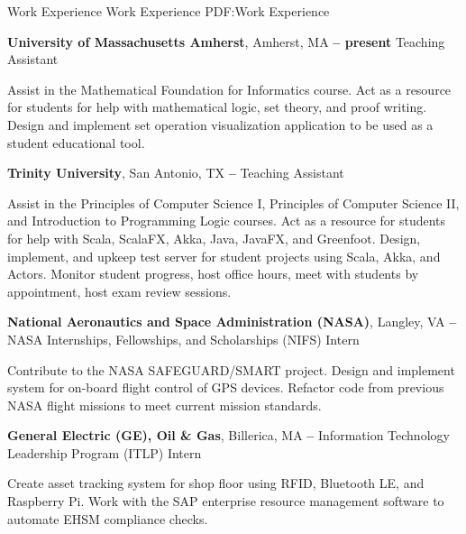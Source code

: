 \Section
{Work Experience}
{Work Experience}
{PDF:Work Experience}

\Entry
\textbf{University of Massachusetts Amherst},
Amherst, MA 
\dotfill
\textbf{ -- present}
\Gap
Teaching Assistant
\begin{Detail}
    \SubBulletItem
    Assist in the Mathematical Foundation for Informatics course.
    \SubBulletItem
    Act as a resource for students for help with mathematical logic, set theory, and proof writing.
    \SubBulletItem
    Design and implement set operation visualization application to be used as a student educational tool.
\end{Detail}

\BigGap
\Entry
\textbf{Trinity University},
San Antonio, TX
\dotfill
\textbf{ -- }
\Gap
Teaching Assistant
\begin{Detail}
    \SubBulletItem
    Assist in the Principles of Computer Science I, Principles of Computer Science II, and Introduction to Programming Logic courses.
    \SubBulletItem
    Act as a resource for students for help with Scala, ScalaFX, Akka, Java, JavaFX, and Greenfoot.
    \SubBulletItem
    Design, implement, and upkeep test server for student projects using Scala, Akka, and Actors.
    \SubBulletItem
    Monitor student progress, host office hours, meet with students by appointment, host exam review sessions.
\end{Detail}

\BigGap
\Entry
\textbf{National Aeronautics and Space Administration (NASA)},
Langley, VA
\dotfill
\textbf{ -- }
\Gap
NASA Internships, Fellowships, and Scholarships (NIFS) Intern
\begin{Detail}
    \SubBulletItem
    Contribute to the NASA SAFEGUARD/SMART project.
    \SubBulletItem
    Design and implement system for on-board flight control of GPS devices.
    \SubBulletItem
    Refactor code from previous NASA flight missions to meet current mission standards.
\end{Detail}

\Entry
\BigGap
\textbf{General Electric (GE), Oil \& Gas},
Billerica, MA
\dotfill
\textbf{ --
}
\Gap
Information Technology Leadership Program (ITLP) Intern
\begin{Detail}
    \SubBulletItem
    Create asset tracking system for shop floor using RFID, Bluetooth LE, and Raspberry Pi.
    \SubBulletItem
    Work with the SAP enterprise resource management software to automate EHSM compliance checks.
\end{Detail}
